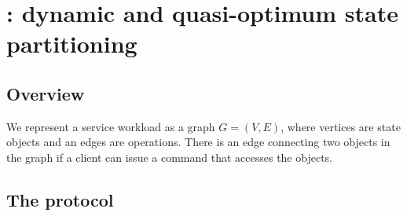 \section{\dynastar: dynamic and quasi-optimum state partitioning}


\subsection{Overview}

We represent a service workload as a graph $G = (V, E)$, where vertices are state objects and an edges are operations.
There is an edge connecting two objects in the graph if a client can issue a command that accesses the objects. 




\subsection{The \dynastar protocol}

%

